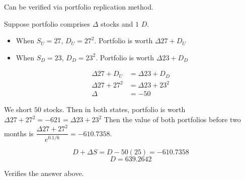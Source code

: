 \documentclass[11pt]{scrartcl}
\begin{document}
Can be verified via portfolio replication method.

Suppose portfolio comprises $\Delta$ stocks and $1$ $D$.

\begin{itemize}
\item When $S_U = 27$, $D_U = 27^2$. Portfolio is worth $\Delta 27 + D_U$
\item When $S_D = 23$, $D_D = 23^2$. Portfolio is worth $\Delta 23 + D_D$
\end{itemize}

\begin{align*}
\Delta 27 + D_U &= \Delta 23 + D_D \\
\Delta 27 + 27^2 &= \Delta 23 + 23^2 \\
\Delta &= -50
\end{align*}

We short $50$ stocks. Then in both states, portfolio is worth $\Delta 27 + 27^2 = -621 = \Delta 23 + 23^2$ Then the value of both portfolios before two months is $\dfrac{\Delta 27 + 27^2}{e^{0.1/6}} = -610.7358$.

\[D + \Delta S = D -50(25) = -610.7358\]
\[D = 639.2642\]

Verifies the answer above.
\end{document}
